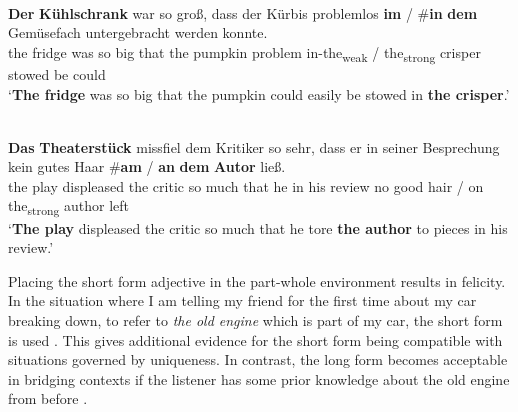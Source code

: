 \documentclass[output=paper,
modfonts
]{langscibook}
\begin{document}
\begin{exe}
	\ex \label{ex:sereikaite:52}
	 \\
	\gll \textbf{Der} \textbf{Kühlschrank} {war} {so} {groß}, {dass} {der} {Kürbis} {problemlos} \textbf{im} \textnormal{/} \#\textbf{in} \textbf{dem} {Gemüsefach} {untergebracht} {werden} {konnte}.\\
	{the} {fridge} was so big that the pumpkin problem {in-the\textsubscript{weak}} / \phantom{\#}{in} {the\textsubscript{strong}} crisper stowed be could\\
	\trans `\textbf{The fridge} was so big that the pumpkin could easily be stowed in \textbf{the crisper}.' \citep[52]{Schwarz2009}
\end{exe} 

\begin{exe}
	\ex \label{ex:sereikaite:53}
	 \\
	\gll \textbf{Das} \textbf{Theaterstück} {missfiel} {dem} {Kritiker} {so} {sehr}, {dass} {er} {in} {seiner} {Besprechung} {kein} {gutes} {Haar} \textnormal{\#}\textbf{am} \textnormal{/} \textbf{an} \textbf{dem} \textbf{Autor} {ließ}.\\
	{the} {play} displeased the critic so much that he in his review no good hair  / {on} {the\textsubscript{strong}} {author} left\\
	\trans ‘\textbf{The play} displeased the critic so much that he tore \textbf{the author} to pieces in his review.’ \citep[53]{Schwarz2009}
\end{exe}


Placing the short form adjective in the part-whole environment results in felicity. In the situation where I am telling my friend for the first time about my car breaking down, to refer to \textit{the old engine} which is part of my car, the short form is used . This gives additional evidence for the short form being compatible with situations governed by uniqueness. In contrast, the long form becomes acceptable in bridging contexts if the listener has some prior knowledge about the old engine from before . 
\end{document}
